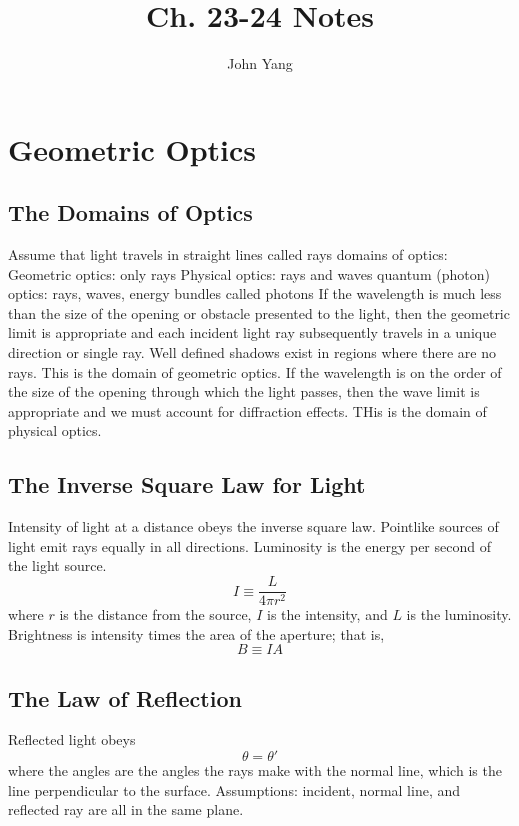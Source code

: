 \documentclass[twocolumn]{article}
\title{Ch. 23-24 Notes}
\author{John Yang}
\begin{document}
\maketitle
\section{Geometric Optics}
\subsection{The Domains of Optics}
\begin{outline}
\1 Assume that light travels in straight lines called rays
\1 domains of optics: 
    \2 Geometric optics: only rays 
    \2 Physical optics: rays and waves 
    \2 quantum (photon) optics: rays, waves, energy bundles called photons 
\1 If the wavelength is much less than the size of the opening or obstacle presented to the light, then the geometric limit is appropriate and each incident light ray subsequently travels in a unique direction or single ray. Well defined shadows exist in regions where there are no rays. This is the domain of geometric optics. 
\1 If the wavelength is on the order of the size of the opening through which the light passes, then the wave limit is appropriate and we must account for diffraction effects. THis is the domain of physical optics. 

\end{outline}
\subsection{The Inverse Square Law for Light}
\begin{outline}
\1 Intensity of light at a distance obeys the inverse square law. Pointlike sources of light emit rays equally in all directions. 
\1 Luminosity is the energy per second of the light source. \[I\equiv\dfrac{L}{4\pi r^2}\] where $r$ is the distance from the source, $I$ is the intensity, and $L$ is the luminosity. 
\1 Brightness is intensity times the area of the aperture; that is, \[B\equiv IA\]


\end{outline}
\subsection{The Law of Reflection}
\begin{outline}
\1 Reflected light obeys \[\theta=\theta'\] where the angles are the angles the rays make with the normal line, which is the line perpendicular to the surface. Assumptions: incident, normal line, and reflected ray are all in the same plane. 
\end{outline}
\end{document}
